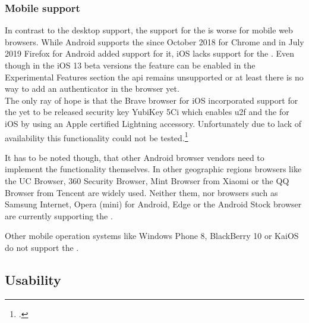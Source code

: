 \subsubsection{Mobile support}

In contrast to the desktop support, the support for the \wa{} is worse for mobile web browsers. While Android supports the \wa{} since October 2018 for Chrome and in July 2019 Firefox for Android added support for it, iOS lacks support for the \wa. Even though in the iOS 13 beta versions the feature can be enabled in the \frqq Experimental Features\flqq{} section the \gls{api} remains unsupported or at least there is no way to add an authenticator in the browser yet.\\
The only ray of hope is that the Brave browser for iOS incorporated support for the yet to be released security key \frqq YubiKey 5Ci\flqq{} which enables \gls{u2f} and the \wa{} for iOS by using an Apple certified Lightning accessory. Unfortunately due to lack of availability this functionality could not be tested.\footcite[See][]{brave-ios}

It has to be noted though, that other Android browser vendors need to implement the functionality themselves. In other geographic regions browsers like the UC Browser, 360 Security Browser, Mint Browser from Xiaomi or the QQ Browser from Tencent are widely used. Neither them, nor browsers such as Samsung Internet, Opera (mini) for Android, Edge or the Android Stock browser are currently supporting the \wa.

Other mobile operation systems like Windows Phone 8, BlackBerry 10 or KaiOS do not support the \wa.

\subsection{Usability}























